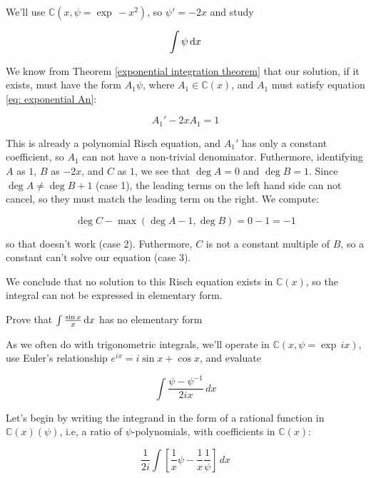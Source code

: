 We'll use ${\mathbb C}(x, \psi = \exp\, -x^2)$, so $\psi' = -2x$ and
study

$$\int \psi \, {\rm d}x$$

We know from Theorem \ref{exponential integration theorem} that our
solution, if it exists, must have the form $A_1\psi$, where $A_1 \in
{\mathbb C}(x)$, and $A_1$ must satisfy equation \eqref{eq: exponential An}:

$$A_1' - 2x A_1 = 1$$

This is already a polynomial Risch equation, and $A_1'$ has only a
constant coefficient, so $A_1$ can not have a non-trivial denominator.
Futhermore, identifying $A$ as $1$, $B$ as $-2x$, and $C$ as $1$, we
see that $\deg A = 0$ and $\deg B = 1$.  Since $\deg A \ne \deg B + 1$
(case 1), the leading terms on the left hand side can not cancel, so
they must match the leading term on the right.  We compute:

$$\deg C - \max(\deg A - 1, \deg B) = 0 - 1 = -1$$

so that doesn't work (case 2).  Futhermore, $C$ is not a constant
multiple of $B$, so a constant can't solve our equation (case 3).

We conclude that no solution to this Risch equation exists in ${\mathbb C}(x)$,
so the integral can not be expressed in elementary form.

\endexample


\example Prove that $\int \frac{\sin x}{x} \, {\rm d}x$ has no elementary form

As we often do with trigonometric integrals, we'll operate in
${\mathbb C}(x, \psi = \exp \,ix)$, use Euler's relationship
$e^{ix}=i\sin x + \cos x$, and evaluate

$$\int \frac{\psi - \psi^{-1}}{2ix} \,dx$$

Let's begin by writing the integrand in the form of a rational
function in ${\mathbb C}(x)(\psi)$, i.e, a ratio
of $\psi$-polynomials, with coefficients in ${\mathbb C}(x)$:

$$\frac{1}{2i} \int \left[ \frac{1}{x}\psi - \frac{1}{x}\frac{1}{\psi} \right]\,dx$$

\begin{comment}
We want to split the denominator into its normal and special
components, by factoring it into irreducible polynomials and
classifying each one as normal or special.  In this case, the
factoriziation is trivial, and we know from theorem \ref{basic
exponential properties} that $\psi$ is special.

Can we have any logarithms in our integral?  Let's see.
Any logarithm of a rational function can be factored and
split into separate logarithms using basic properties
of a logarithms:

$$\ln ab = \ln a + \ln b \qquad\qquad \ln\frac{a}{b} = \ln a - \ln b$$

So, we need only consider logarithms of irreducible polynomials.

Theorem \ref{basic exponential properties} also tells us that we can
have no normal polynomials in denominator of our integral,
\end{comment}


